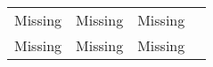 \begin{minipage}{\columnwidth}
\begin{tabular}{lccc}
Missing & Missing & Missing \\
Missing & Missing & Missing \\
\end{tabular}
\end{minipage}
